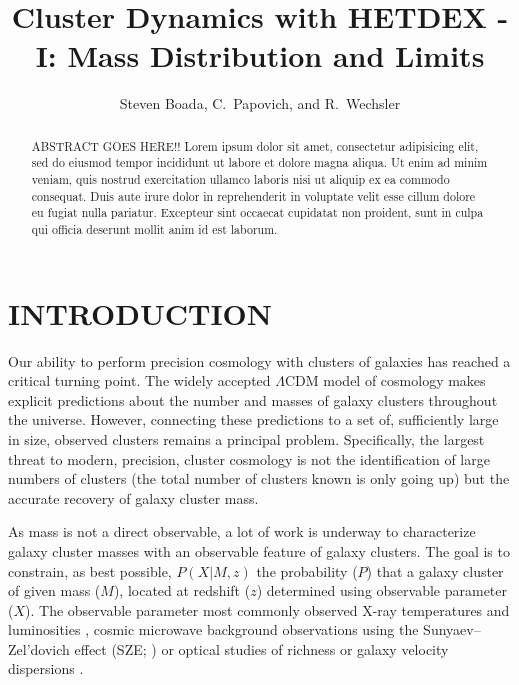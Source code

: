 \documentclass[apj, revtex4]{emulateapj}
\begin{document}
\title{Cluster Dynamics with HETDEX - I: Mass Distribution and Limits}

\author{\sc Steven Boada, 
C.~Papovich, and
R.~Wechsler} 


\begin{abstract}
\noindent
ABSTRACT GOES HERE!!
Lorem ipsum dolor sit amet, consectetur adipisicing elit, sed do eiusmod tempor incididunt ut labore et dolore magna aliqua. Ut enim ad minim veniam, quis nostrud exercitation ullamco laboris nisi ut aliquip ex ea commodo consequat. Duis aute irure dolor in reprehenderit in voluptate velit esse cillum dolore eu fugiat nulla pariatur. Excepteur sint occaecat cupidatat non proident, sunt in culpa qui officia deserunt mollit anim id est laborum.
\end{abstract}

\section{INTRODUCTION}
Our ability to perform precision cosmology with clusters of galaxies has reached a critical turning point. The widely accepted $\Lambda$CDM model of cosmology makes explicit predictions about the number and masses of galaxy clusters throughout the universe. However, connecting these predictions to a set of, sufficiently large in size, observed clusters remains a principal problem. Specifically, the largest threat to modern, precision, cluster cosmology is not the identification of large numbers of clusters (the total number of clusters known is only going up) but the accurate recovery of galaxy cluster mass.

As mass is not a direct observable, a lot of work is underway to characterize galaxy cluster masses with an observable feature of galaxy clusters. The goal is to constrain, as best possible, $P(X|M,z)$ the probability ($P$) that a galaxy cluster of given mass ($M$), located at redshift ($z$) determined using observable parameter ($X$). The observable parameter most commonly observed X-ray temperatures and luminosities , cosmic microwave background observations  using the Sunyaev--Zel’dovich effect (SZE; \citealt{Sunyaev1972}) or optical studies  of richness  or galaxy velocity dispersions .
\end{document}
